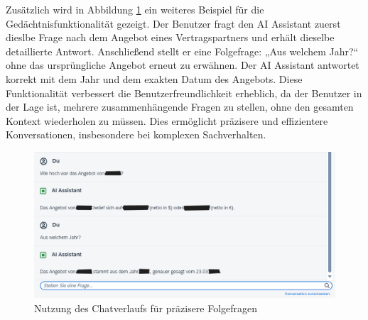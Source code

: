 Zusätzlich wird in Abbildung \ref{fig:memory_use} ein weiteres Beispiel für die Gedächtnisfunktionalität gezeigt. Der Benutzer fragt den AI Assistant zuerst dieslbe Frage nach dem Angebot eines Vertragspartners 
und erhält dieselbe detaillierte Antwort. Anschließend stellt er eine Folgefrage: „Aus welchem Jahr?“ ohne das ursprüngliche Angebot erneut zu erwähnen. 
Der AI Assistant antwortet korrekt mit dem Jahr und dem exakten Datum des Angebots. Diese Funktionalität verbessert die Benutzerfreundlichkeit erheblich, 
da der Benutzer in der Lage ist, mehrere zusammenhängende Fragen zu stellen, ohne den gesamten Kontext wiederholen zu müssen. 
Dies ermöglicht präzisere und effizientere Konversationen, insbesondere bei komplexen Sachverhalten.

\begin{figure}[H]
    \centering
    \includegraphics[width=1\textwidth]{img/Chatbot_memory_use.png}
    \caption{Nutzung des Chatverlaufs für präzisere Folgefragen}
    \label{fig:memory_use}
\end{figure}